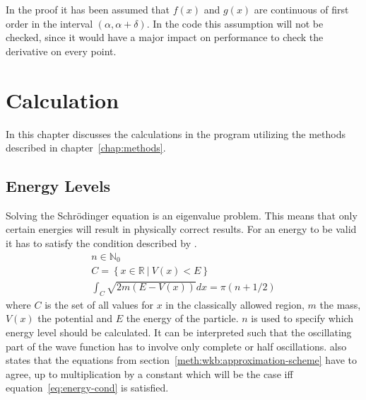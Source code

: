 \documentclass[11pt,DIV=10,final]{scrreprt} %
\begin{document}
In the proof it has been assumed that $f(x)$ and $g(x)$ are continuous of first order in the interval $(\alpha, \alpha + \delta)$. In the code this assumption will not be checked, since it would have a major impact on performance to check the derivative on every point.

\chapter{Calculation}
In this chapter discusses the calculations in the program utilizing the methods described in chapter~\ref{chap:methods}.
\section{Energy Levels}\label{sec:energy-calculation}
Solving the Schrödinger equation is an eigenvalue problem. This means that only certain energies will result in physically correct results. For an energy to be valid it has to satisfy the condition described by \cite[eq. 15.31]{hall2013quantum}.
\begin{align}
  n \in \mathbb{N}_{0}\\
  C = \left\{x \in \mathbb{R}~|~V(x) < E \right\}\\
  \int_{C}\sqrt{2m(E - V(x))}dx = \pi(n + 1/2)\label{eq:energy-cond}
\end{align}
where $C$ is the set of all values for $x$ in the classically allowed region, $m$ the mass, $V(x)$ the potential and $E$ the energy of the particle. $n$ is used to specify which energy level should be
calculated. It can be interpreted such that the oscillating part of the wave function has to involve only complete or half oscillations. \cite{hall2013quantum} also states that the equations from
section~\ref{meth:wkb:approximation-scheme} have to agree, up to multiplication by a constant which will be the case iff equation~\ref{eq:energy-cond} is satisfied.
\end{document}
